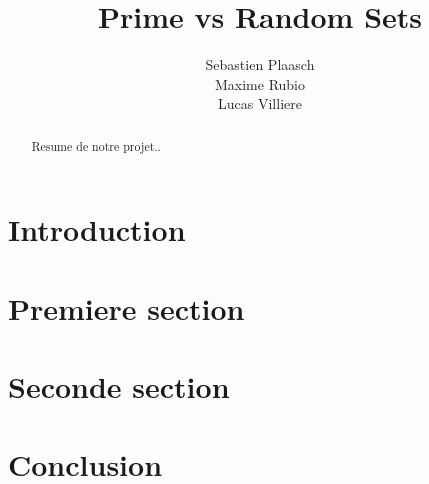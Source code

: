 \documentclass{article}
\begin{document}
\author{Sebastien Plaasch \\ Maxime Rubio  \\ Lucas Villiere}
\title{Prime vs Random Sets}
\maketitle
\tableofcontents
\vspace{\fill} %
  \begin{abstract}
Resume de notre projet..
\end{abstract}
\clearpage

\section*{Introduction}
\label{sec:intro}


\section{Premiere section}



\section{Seconde section}


\section*{Conclusion}


\newpage
\printindex
\end{document}
